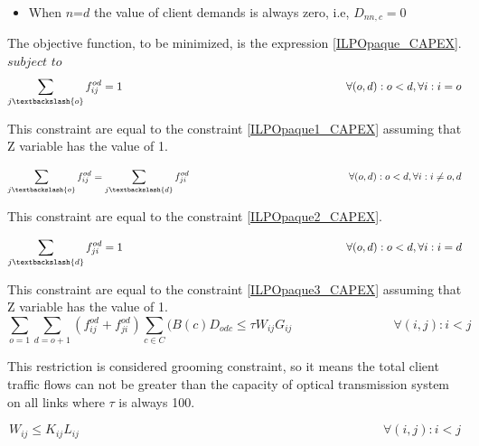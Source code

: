 \begin{itemize}
  \item When $n$=$d$ the value of client demands is always zero, i.e, $D_{nn,c}=0$
\end{itemize}


\vspace{17pt}
The objective function, to be minimized, is the expression \ref{ILPOpaque_CAPEX}.\\

$subject$ $to$
\begin{equation}
\sum_{j\textbackslash \{o\}} f_{ij}^{od} = 1  \qquad \qquad \qquad \qquad \qquad \qquad \qquad \qquad \qquad \qquad
\forall(o,d) : o < d, \forall i: i = o
\label{ILPOpaque1_Surv}
\end{equation}

This constraint are equal to the constraint \ref{ILPOpaque1_CAPEX} assuming that Z variable has the value of 1.

\begin{equation}
\sum_{j\textbackslash \{o\}} f_{ij}^{od} = \sum_{j\textbackslash \{d\}} f_{ji}^{od}   \qquad \qquad \qquad \qquad \qquad \qquad \qquad \qquad
\forall(o,d) : o < d, \forall i: i \neq o,d
\label{ILPOpaque2_Surv}
\end{equation}

This constraint are equal to the constraint \ref{ILPOpaque2_CAPEX}.

\begin{equation}
\sum_{j\textbackslash \{d\}} f_{ji}^{od} = 1  \qquad \qquad \qquad \qquad \qquad \qquad \qquad \qquad \qquad \qquad
\forall(o,d) : o < d, \forall i: i = d
\label{ILPOpaque3_Surv}
\end{equation}

This constraint are equal to the constraint \ref{ILPOpaque3_CAPEX} assuming that Z variable has the value of 1.
\newpage
\begin{equation}
\sum_{o=1} \sum_{d=o+1} \left(f_{ij}^{od} + f_{ji}^{od}\right) \sum_{c\in C} (B\left(c\right) D_{odc}\leq \tau W_{ij} G_{ij} \qquad \qquad \qquad \qquad
\forall(i,j) : i < j
\label{ILPOpaque4_Surv}
\end{equation}

This restriction is considered grooming constraint, so it means the total client traffic flows can not be greater than the capacity of optical transmission system on all links where $\tau$ is always 100.

\begin{equation}
W_{ij} \leq K_{ij} L_{ij} \qquad  \qquad \qquad \qquad \qquad \qquad \qquad \qquad \qquad \qquad \qquad \qquad \forall(i,j) : i < j
\label{ILPOpaque5_Surv}
\end{equation}

